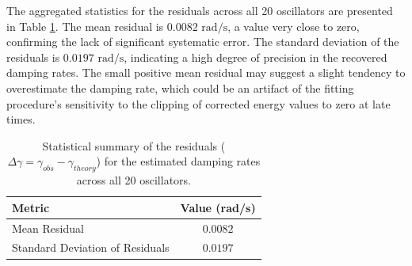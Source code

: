 \documentclass[]{article}
\begin{document}
The aggregated statistics for the residuals across all 20 oscillators are presented in Table \ref{tab:residuals}. The mean residual is $0.0082 \text{ rad/s}$, a value very close to zero, confirming the lack of significant systematic error. The standard deviation of the residuals is $0.0197 \text{ rad/s}$, indicating a high degree of precision in the recovered damping rates. The small positive mean residual may suggest a slight tendency to overestimate the damping rate, which could be an artifact of the fitting procedure's sensitivity to the clipping of corrected energy values to zero at late times.

\begin{table}[h!]
    \centering
    \caption{Statistical summary of the residuals ($\Delta\gamma = \gamma_{obs} - \gamma_{theory}$) for the estimated damping rates across all 20 oscillators.}
    \label{tab:residuals}
    \begin{tabular}{lc}
        \hline
        \hline
        Metric & Value (rad/s) \\
        \hline
        Mean Residual & $0.0082$ \\
        Standard Deviation of Residuals & $0.0197$ \\
        \hline
    \end{tabular}
\end{table}
\end{document}
